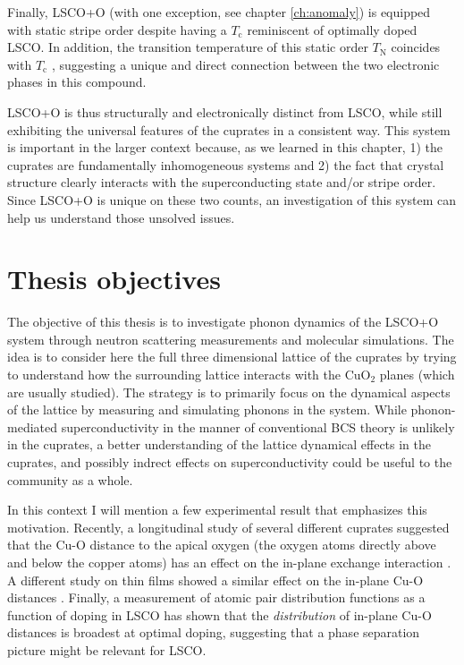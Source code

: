 Finally, LSCO+O (with one exception, see chapter \ref{ch:anomaly}) is equipped with static stripe order despite having a $T_\text{c}$ reminiscent of optimally doped LSCO. In addition, the transition temperature of this static order $T_\text{N}$ coincides with $T_\text{c}$ \cite{Udby2013}, suggesting a unique and direct connection between the two electronic phases in this compound.

LSCO+O is thus structurally and electronically distinct from LSCO, while still exhibiting the universal features of the cuprates in a consistent way. This system is important in the larger context because, as we learned in this chapter, 1) the cuprates are fundamentally inhomogeneous systems and 2) the fact that crystal structure clearly interacts with the superconducting state and/or stripe order. Since LSCO+O is unique on these two counts, an investigation of this system can help us understand those unsolved issues.

\section{Thesis objectives}
The objective of this thesis is to investigate phonon dynamics of the LSCO+O system through neutron scattering measurements and molecular simulations. The idea is to consider here the full three dimensional lattice of the cuprates by trying to understand how the surrounding lattice interacts with the CuO$_2$ planes (which are usually studied). The strategy is to primarily focus on the dynamical aspects of the lattice by measuring and simulating phonons in the system. While phonon-mediated superconductivity in the manner of conventional BCS theory is unlikely in the cuprates, a better understanding of the lattice dynamical effects in the cuprates, and possibly indrect effects on superconductivity could be useful to the community as a whole.

In this context I will mention a few experimental result that emphasizes this motivation. Recently, a longitudinal study of several different cuprates suggested that the Cu-O distance to the apical oxygen (the oxygen atoms directly above and below the copper atoms) has an effect on the in-plane exchange interaction \cite{Peng2017}. A different study on thin films showed a similar effect on the in-plane Cu-O distances \cite{Ivashko2019}. Finally, a measurement of atomic pair distribution functions as a function of doping in LSCO has shown that the \emph{distribution} of in-plane Cu-O distances is broadest at optimal doping, suggesting that a phase separation picture might be relevant for LSCO.

